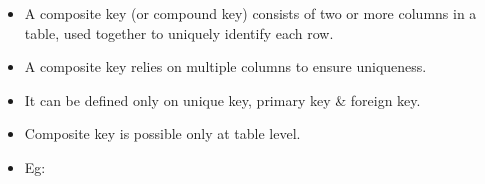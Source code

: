 \setlength{\columnsep}{3pt}
\begin{flushleft}
	
	\begin{itemize}
		\item A composite key (or compound key) consists of two or more columns in a table, used together to uniquely identify each row. 
		\item A composite key relies on multiple columns to ensure uniqueness. 
		\item It can be defined only on unique key, primary key  \& foreign key. 
		\item Composite key is possible only at table level.
		\item Eg:
	\end{itemize}
	
\end{flushleft}


